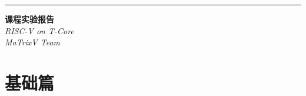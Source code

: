 \documentclass[a4paper, 14pt, oneside]{book} %
\numberwithin{equation}{subsection}
\begin{document}
	\begin{titlepage} %
		
		\raggedleft %
		
		\rule{1pt}{\textheight} %
		\hspace{0.05\textwidth} %
		\parbox[b]{0.75\textwidth}{ %
			
			{\Huge\bfseries  课程实验报告}\\[2\baselineskip] %
			{\LARGE\textit{RISC-V on T-Core}}\\[4\baselineskip] %
			{\Large\textit{MaTrixV Team}} %
			
			\vspace{0.5\textheight} %
			
		}
	\end{titlepage}
	\tableofcontents
	\section{基础篇}
\end{document}
